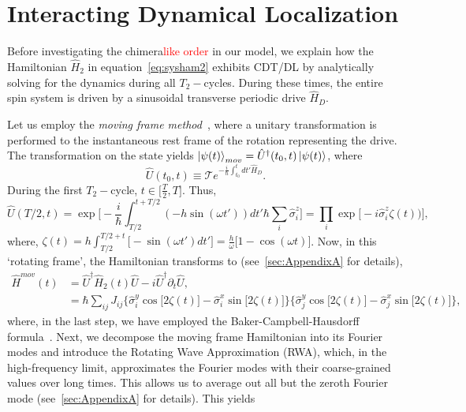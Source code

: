 \documentclass[12pt]{iopart}
\newcommand{\red}[1]{\textcolor{red}{#1}}
\begin{document}
\section{\label{sec:level2} Interacting Dynamical Localization}

Before investigating the chimera\red{like order} in our model, we explain how the Hamiltonian $\hat{H}_2$ in equation~\eqref{eq:sysham2} exhibits CDT/DL by analytically solving for the dynamics during all $T_2-$cycles. During these times,  the entire spin system is driven by a sinusoidal transverse periodic drive $\hat{H}_D$.
	
Let us employ the \textit{moving frame method}~\cite{haldar_dynamical_2021}, where a unitary transformation is performed to the instantaneous rest frame of the rotation representing the drive. The transformation on the state yields $\ket{\psi(t)}_{mov} = \hat{U}^\dagger(t_0,t) \ket{\psi(t)}$, where 
\begin{equation}
    \hat{U}(t_0,t) \equiv \mathcal{T} e^{-\frac{i}{\hbar}\int_{t_0}^{t} dt' \hat{H}_D}.
    \label{eq:rot1}
\end{equation}
During the first $T_2-$cycle, $t \in{\Big[\frac{T}{2}, T \Big]}$. Thus,
\begin{equation}
    \hat{U}\left(T/2,t\right) = \exp \Bigg[-\frac{i}{\hbar}\int_{T/2}^{t+T/2} (-h \sin(\omega t'))dt'\hbar\sum_i\hat{\sigma}^z_i\Bigg]
    = \prod_{i} \exp\Big[-i \hat{\sigma}^z_i\zeta(t))\Big],
\end{equation}
where, $\displaystyle{
    \zeta (t) = h\int_{T/2}^{T/2+t}  \Big[-\sin(\omega t')dt'\Big]=  \frac{h}{\omega}\Big[1-\cos(\omega t)\Big]}$.		
Now, in this `rotating frame', the Hamiltonian transforms to (see~\ref{sec:AppendixA} for details),
\begin{align}
    \hat{H}^{mov}(t) &= \hat{U}^\dagger \hat{H}_2(t) \hat{U}- i \hat{U}^\dagger \partial_t \hat{U},\nonumber\\
    &=\hbar\sum_{ij}J_{ij}\Big\{\hat{\sigma}^y_i\cos{\big[2\zeta(t)\big]}-\hat{\sigma}^x_i\sin{\big[2\zeta(t)\big]}\Big\}\Big\{\hat{\sigma}^y_j\cos{\big[2\zeta(t)\big]}-\hat{\sigma}^x_j\sin{\big[2\zeta(t)\big]}\Big\},
    \label{eq:movham}
\end{align}
where, in the last step, we have employed the Baker-Campbell-Hausdorff formula~\cite{Magnus1954}. Next, we decompose the moving frame Hamiltonian into its Fourier modes and introduce the Rotating Wave Approximation (RWA), which, in the high-frequency limit, approximates the Fourier modes with their coarse-grained values over long times. This allows us to average out all but the zeroth Fourier mode (see~\ref{sec:AppendixA} for details). This yields
\end{document}
